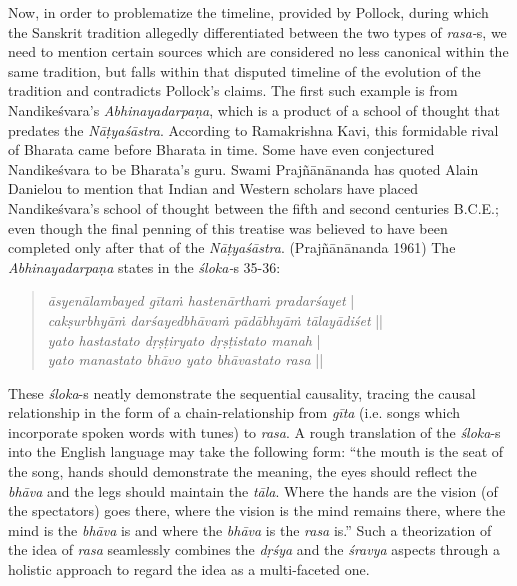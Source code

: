 Now, in order to problematize the timeline, provided by Pollock, during which the Sanskrit tradition allegedly differentiated between the two types of \textsl{rasa-}s, we need to mention certain sources which are considered no less canonical within the same tradition, but falls within that disputed timeline of the evolution of the tradition and contradicts Pollock’s claims. The first such example is from Nandikeśvara’s \textsl{Abhinayadarpaṇa}, which is a product of a school of thought that predates the \textsl{Nāṭyaśāstra}. According to Ramakrishna Kavi, this formidable rival of Bharata came before Bharata in time. Some have even conjectured Nandikeśvara to be Bharata’s guru. Swami Prajñānānanda has quoted Alain Danielou to mention that Indian and Western scholars have placed Nandikeśvara’s school of thought between the fifth and second centuries B.C.E.; even though the final penning of this treatise was believed to have been completed only after that of the \textsl{Nāṭyaśāstra}. (Prajñānānanda 1961) The \textsl{Abhinayadarpaṇa} states in the \textsl{śloka-}s 35-36:
\begin{quote}
\textsl{āsyenālambayed gītaṁ hastenārthaṁ pradarśayet} |  \\
\textsl{cakṣurbhyāṁ darśayedbhāvaṁ pādābhyāṁ tālayādiśet} ||   \\
\textsl{yato hastastato dṛṣṭiryato dṛṣṭistato manah} | \\
\textsl{yato manastato bhāvo yato bhāvastato rasa} || 
\end{quote}

These \textsl{śloka}-s neatly demonstrate the sequential causality, tracing the causal relationship in the form of a chain-relationship from \textsl{gīta} (i.e. songs which incorporate spoken words with tunes) to \textsl{rasa}. A rough translation of the \textsl{śloka}-s into the English language may take the following form: “the mouth is the seat of the song, hands should demonstrate the meaning, the eyes should reflect the \textsl{bhāva} and the legs should maintain the \textsl{tāla}. Where the hands are the vision (of the spectators) goes there, where the vision is the mind remains there, where the mind is the \textsl{bhāva} is and where the \textsl{bhāva} is the \textsl{rasa} is.” Such a theorization of the idea of \textsl{rasa} seamlessly combines the \textsl{dṛśya} and the \textsl{śravya} aspects through a holistic approach to regard the idea as a multi-faceted one. 

